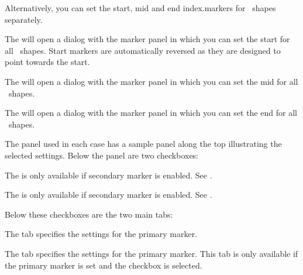Alternatively, you can set the start, mid and end
\glspl{index.marker} for \selected\ shapes separately.


The  will open a dialog with the
marker panel in which you can set the start  for
all \selected\ shapes. Start markers are automatically reversed as
they are designed to point towards the start.


The  will open a dialog with the
marker panel in which you can set the mid  for
all \selected\ shapes.


The  will open a dialog with the
marker panel in which you can set the end  for
all \selected\ shapes.

The  panel used in each case has a sample panel along the top
illustrating the selected settings. Below the panel are two
checkboxes:


The  is only available if secondary marker
is enabled. See .


The  is only available if secondary marker
is enabled. See .

Below these checkboxes are the two main tabs:


The  tab specifies the settings for the
primary marker.


The  tab specifies the settings for the
primary marker. This tab is only available if the primary marker is
set and the  checkbox is selected.

